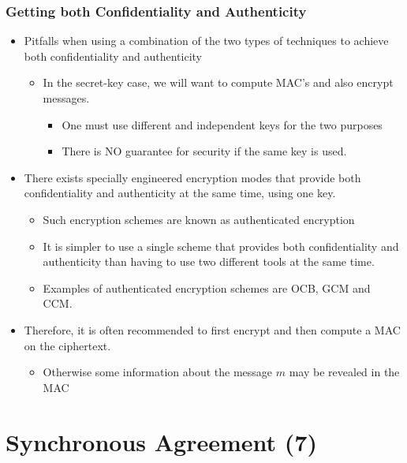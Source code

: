 \documentclass[11pt]{article}
\begin{document}
\subsubsection{Getting both Confidentiality and Authenticity}
\label{sec:org1b311f2}
\begin{itemize}
\item Pitfalls when using a combination of the two types of techniques to achieve both confidentiality and authenticity
\begin{itemize}
\item In the secret-key case, we will want to compute MAC’s and also encrypt messages.
\begin{itemize}
\item One must use different and independent keys for the two purposes
\item There is NO guarantee for security if the same key is used.
\end{itemize}
\end{itemize}
\end{itemize}


\begin{itemize}
\item There exists specially engineered encryption modes that provide both confidentiality and authenticity at the same time, using one key.
\begin{itemize}
\item Such encryption schemes are known as authenticated encryption
\item It is simpler to use a single scheme that provides both confidentiality and authenticity than having to use two different tools at the same time.
\item Examples of authenticated encryption schemes are OCB, GCM and CCM.
\end{itemize}

\item Therefore, it is often recommended to first encrypt and then compute a MAC on the ciphertext.
\begin{itemize}
\item Otherwise some information about the message \(m\) may be revealed in the MAC
\end{itemize}
\end{itemize}

\section{Synchronous Agreement (7)}
\label{sec:org9983241}
\end{document}
